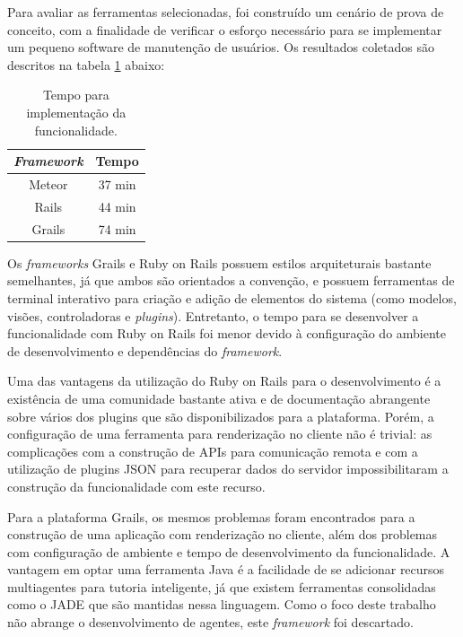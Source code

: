 Para avaliar as ferramentas selecionadas, foi construído um cenário de prova de conceito, com a finalidade de verificar o esforço necessário para se implementar um pequeno software de manutenção de usuários. Os resultados coletados são descritos na tabela \ref{tab:tempo} abaixo:

\begin{table}[h!]
	\centering
	\caption{Tempo para implementação da funcionalidade.}
	\begin{tabular}{ c | c }
		\hline
		\textit{Framework} & Tempo \\
		\hline
		Meteor & 37 min \\
		\hline
		Rails & 44 min \\
		\hline
		Grails & 74 min \\
		\hline
	\end{tabular}
	\label{tab:tempo}
\end{table}

Os \textit{frameworks} Grails e Ruby on Rails possuem estilos arquiteturais bastante semelhantes, já que ambos são orientados a convenção, e possuem ferramentas de terminal interativo para criação e adição de elementos do sistema (como modelos, visões, controladoras e \textit{plugins}). Entretanto, o tempo para se desenvolver a funcionalidade com Ruby on Rails foi menor devido à configuração do ambiente de desenvolvimento e dependências do \textit{framework}.

Uma das vantagens da utilização do Ruby on Rails para o desenvolvimento é a existência de uma comunidade bastante ativa e de documentação abrangente sobre vários dos plugins que são disponibilizados para a plataforma. Porém, a configuração de uma ferramenta para renderização no cliente não é trivial: as complicações com a construção de APIs para comunicação remota e com a utilização de plugins JSON para recuperar dados do servidor impossibilitaram a construção da funcionalidade com este recurso.

Para a plataforma Grails, os mesmos problemas foram encontrados para a construção de uma aplicação com renderização no cliente, além dos problemas com configuração de ambiente e tempo de desenvolvimento da funcionalidade. A vantagem em optar uma ferramenta Java é a facilidade de se adicionar recursos multiagentes para tutoria inteligente, já que existem ferramentas consolidadas como o JADE \cite{jade2015} que são mantidas nessa linguagem. Como o foco deste trabalho não abrange o desenvolvimento de agentes, este \textit{framework} foi descartado.

